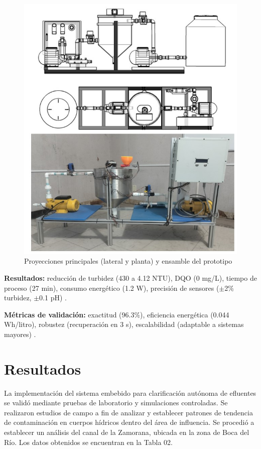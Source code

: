 \documentclass[conference]{IEEEtran}
\begin{document}
\begin{figure}[htbp]
	\centering
	\includegraphics[width=0.8\columnwidth]{fig21.jpg}
	\caption{Proyecciones principales (lateral y planta) y ensamble del prototipo}
	\label{fig:21}
\end{figure}


\textbf{Resultados:} reducción de turbidez (430 a 4.12 NTU), DQO (0 mg/L), tiempo de proceso (27 min), consumo energético (1.2 W), precisión de sensores ($\pm$2\% turbidez, $\pm$0.1 pH) \cite{b39}.

\textbf{Métricas de validación:} exactitud (96.3\%), eficiencia energética (0.044 Wh/litro), robustez (recuperación en 3 s), escalabilidad (adaptable a sistemas mayores) \cite{b40}.

\section{Resultados}

La implementación del sistema embebido para clarificación autónoma de efluentes se validó mediante pruebas de laboratorio y simulaciones controladas. Se realizaron estudios de campo a fin de analizar y establecer patrones de tendencia de contaminación en cuerpos hídricos dentro del área de influencia. Se procedió a establecer un análisis del canal de la Zamorana, ubicada en la zona de Boca del Río. Los datos obtenidos se encuentran en la Tabla 02.
\end{document}
